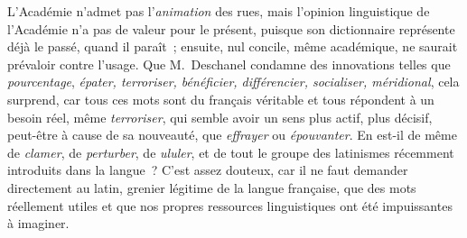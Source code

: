 \documentclass[french,twoside]{book} %
\begin{document}
L’Académie n’admet pas l’{\itshape animation} des rues, mais l’opinion linguistique de l’Académie n’a pas de valeur pour le présent, puisque son dictionnaire représente déjà le passé, quand il paraît ; ensuite, nul concile, même académique, ne saurait prévaloir contre l’usage. Que M. Deschanel condamne des innovations telles que {\itshape pourcentage}, {\itshape épater, terroriser, bénéficier, différencier, socialiser, méridional}, cela surprend, car tous ces mots sont du français véritable et tous répondent à un besoin réel, même {\itshape terroriser}, qui semble avoir un sens plus actif, plus décisif, peut-être à cause de sa nouveauté, que {\itshape effrayer} ou {\itshape épouvanter}. En est-il de même de {\itshape clamer}, de {\itshape perturber}, de {\itshape ululer}, et de tout le groupe des latinismes récemment introduits dans la langue ? C’est assez douteux, car il ne faut demander directement au latin, grenier légitime de la langue française, que des mots réellement utiles et que nos propres ressources linguistiques ont été impuissantes à imaginer.\par
\end{document}
